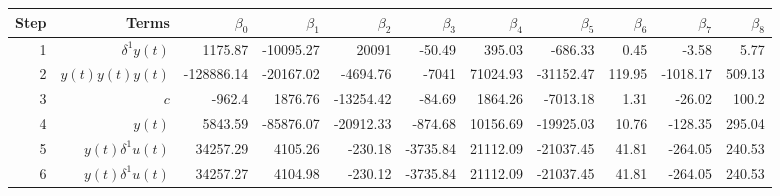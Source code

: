 \begin{tabular}{rrrrrrrrrrr}
Step & Terms & $\beta_{0}$ & $\beta_{1}$ & $\beta_{2}$ & $\beta_{3}$ & $\beta_{4}$ & $\beta_{5}$ & $\beta_{6}$ & $\beta_{7}$ & $\beta_{8}$ \\ 
\hline 
1 & $\delta^1 y(t)$ & 1175.87 & -10095.27 & 20091 & -50.49 & 395.03 & -686.33 & 0.45 & -3.58 & 5.77 \\ 
2 & $y(t)y(t)y(t)$ & -128886.14 & -20167.02 & -4694.76 & -7041 & 71024.93 & -31152.47 & 119.95 & -1018.17 & 509.13 \\ 
3 & $c$ & -962.4 & 1876.76 & -13254.42 & -84.69 & 1864.26 & -7013.18 & 1.31 & -26.02 & 100.2 \\ 
4 & $y(t)$ & 5843.59 & -85876.07 & -20912.33 & -874.68 & 10156.69 & -19925.03 & 10.76 & -128.35 & 295.04 \\ 
5 & $y(t)\delta^1 u(t)$ & 34257.29 & 4105.26 & -230.18 & -3735.84 & 21112.09 & -21037.45 & 41.81 & -264.05 & 240.53 \\ 
6 & $y(t)\delta^1 u(t)$ & 34257.27 & 4104.98 & -230.12 & -3735.84 & 21112.09 & -21037.45 & 41.81 & -264.05 & 240.53 \\ 
\hline 
\end{tabular}